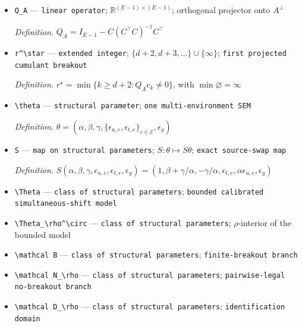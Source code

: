 \documentclass{article}
\begin{document}
\begin{itemize}
  \par\smallskip\noindent\emph{Definition.} \(A=\operatorname{col}(C)\)
  \item \texttt{Q\_\allowbreak{}A} --- \texttt{linear operator}; \(\mathbb R^{(E-1)\times(E-1)}\); orthogonal projector onto \(A^\perp\)
  \par\smallskip\noindent\emph{Definition.} \(Q_A=I_{E-1}-C(C^\top C)^{-1}C^\top\)
  \item \texttt{r\textasciicircum{}\textbackslash{}\allowbreak{}star} --- \texttt{extended integer}; \(\{d+2,d+3,\ldots\}\cup\{\infty\}\); \texttt{first projected cumulant breakout}
  \par\smallskip\noindent\emph{Definition.} \(r^\star=\min\{k\ge d+2:Q_Ac_k\ne0\}\), with \(\min\varnothing=\infty\)
  \item \texttt{\textbackslash{}\allowbreak{}theta} --- \texttt{structural parameter}; \texttt{one multi-\allowbreak{}environment SEM}
  \par\smallskip\noindent\emph{Definition.} \(\theta=(\alpha,\beta,\gamma,\{\epsilon_{u,e},\epsilon_{t,e}\}_{e\in\mathcal E},\epsilon_y)\)
  \item \texttt{S} --- \texttt{map on structural parameters}; \(S:\theta\mapsto S\theta\); \texttt{exact source-\allowbreak{}swap map}
  \par\smallskip\noindent\emph{Definition.} \(S(\alpha,\beta,\gamma,\epsilon_{u,e},\epsilon_{t,e},\epsilon_y)=(1,\beta+\gamma/\alpha,-\gamma/\alpha,\epsilon_{t,e},\alpha\epsilon_{u,e},\epsilon_y)\)
  \item \texttt{\textbackslash{}\allowbreak{}Theta} --- \texttt{class of structural parameters}; \texttt{bounded calibrated simultaneous-\allowbreak{}shift model}
  \item \texttt{\textbackslash{}\allowbreak{}Theta\_\allowbreak{}\textbackslash{}\allowbreak{}rho\textasciicircum{}\textbackslash{}\allowbreak{}circ} --- \texttt{class of structural parameters}; \(\rho\)-interior of the bounded model
  \item \texttt{\textbackslash{}\allowbreak{}mathcal B} --- \texttt{class of structural parameters}; \texttt{finite-\allowbreak{}breakout branch}
  \item \texttt{\textbackslash{}\allowbreak{}mathcal N\_\allowbreak{}\textbackslash{}\allowbreak{}rho} --- \texttt{class of structural parameters}; \texttt{pairwise-\allowbreak{}legal no-\allowbreak{}breakout branch}
  \item \texttt{\textbackslash{}\allowbreak{}mathcal D\_\allowbreak{}\textbackslash{}\allowbreak{}rho} --- \texttt{class of structural parameters}; \texttt{identification domain}

\end{itemize}
\end{document}
